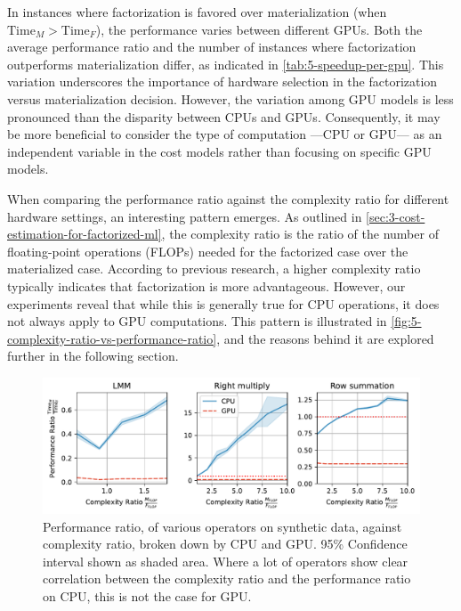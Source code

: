 In instances where factorization is favored over materialization (when $\text{Time}_M > \text{Time}_F$), the performance varies between different GPUs. Both the average performance ratio and the number of instances where factorization outperforms materialization differ, as indicated in \autoref{tab:5-speedup-per-gpu}. This variation underscores the importance of hardware selection in the factorization versus materialization decision. However, the variation among GPU models is less pronounced than the disparity between CPUs and GPUs. Consequently, it may be more beneficial to consider the type of computation —CPU or GPU— as an independent variable in the cost models rather than focusing on specific GPU models.

When comparing the performance ratio against the complexity ratio for different hardware settings, an interesting pattern emerges. As outlined in \autoref{sec:3-cost-estimation-for-factorized-ml}, the complexity ratio is the ratio of the number of floating-point operations (FLOPs) needed for the factorized case over the materialized case. According to previous research, a higher complexity ratio typically indicates that factorization is more advantageous. However, our experiments reveal that while this is generally true for CPU operations, it does not always apply to GPU computations. This pattern is illustrated in \autoref{fig:5-complexity-ratio-vs-performance-ratio}, and the reasons behind it are explored further in the following section.

\begin{figure}[ht]
  \centering
  \includegraphics[width=\linewidth]{chapters/05_cost_estimation/figures/motivation_speedup_complexity_ratio.pdf}
  \caption[Performance ratio plotted against complexity ratio]{Performance ratio, of various operators on synthetic data, against complexity ratio, broken down by CPU and GPU. 95\% Confidence interval shown as shaded area. Where a lot of operators show clear correlation between the complexity ratio and the performance ratio on CPU, this is not the case for GPU.}
  \label{fig:5-complexity-ratio-vs-performance-ratio}
\end{figure}


